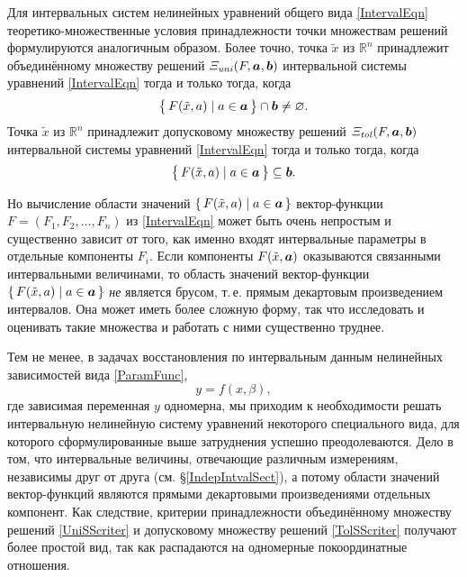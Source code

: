 \documentclass[a5paper,openany]{book}
\newcommand{\mbf}[1]{\protect\text{\boldmath$#1$}}
\newcommand{\mbb}{\mathbb}
\newcommand{\USS}{\varXi_\mathit{\hspace{-0.5pt}uni}}
\newcommand{\TSS}{\varXi_\mathit{\hspace{-0.5pt}tol}}
\begin{document}
Для интервальных систем нелинейных уравнений общего вида \eqref{IntervalEqn} 
теоретико-множественные условия принадлежности точки множествам решений формулируются 
аналогичным образом. Более точно, точка $\tilde{x}$ из $\mbb{R}^n$ принадлежит 
объединённому множеству решений $\USS(F,\mbf{a}, \mbf{b})$ интервальной системы 
уравнений \eqref{IntervalEqn} тогда и только тогда, когда 
\begin{equation} 
\label{UniSScriter} 
\bigl\{\,F(\tilde{x},a) \mid a\in\mbf{a}\,\bigr\}\cap\mbf{b}\neq\varnothing. 
\end{equation}
Точка $\tilde{x}$ из $\mbb{R}^n$ принадлежит допусковому множеству решений 
$\TSS(F,\mbf{a}, \mbf{b})$ интервальной системы уравнений \eqref{IntervalEqn} 
тогда и только тогда, когда 
\begin{equation}
\label{TolSScriter} 
\bigl\{\,F(\tilde{x},a) \mid a\in\mbf{a}\,\bigr\}\subseteq\mbf{b}. 
\end{equation} 
  
Но вычисление области значений $\{\,F(\tilde{x},a) \mid a\in\mbf{a}\,\}$ 
вектор-функции $F = (F_{1}, F_{2}, \ldots, F_{n})$ из \eqref{IntervalEqn} 
может быть очень непростым и существенно зависит от того, как именно входят 
интервальные параметры в отдельные компоненты $F_i$. Если компоненты $F(\tilde{x}, 
\mbf{a})$ оказываются связанными интервальными величинами, то область значений 
вектор-функции $\{\,F(\tilde{x},a) \mid a\in\mbf{a}\,\}$ \emph{не} является брусом, 
т.\,е. прямым декартовым произведением интервалов. Она может иметь более сложную 
форму, так что исследовать и оценивать такие множества и работать с ними существенно 
труднее. 
  
Тем не менее, в задачах восстановления по интервальным данным нелинейных 
зависимостей вида \eqref{ParamFunc}, 
\begin{equation*}
y = f(x,\beta), 
\end{equation*}
где зависимая переменная $y$ одномерна, мы приходим к необходимости решать 
интервальную нелинейную систему уравнений некоторого специального вида, 
для которого сформулированные выше затруднения успешно преодолеваются. Дело в том, 
что интервальные величины, отвечающие различным измерениям, независимы друг от друга 
(см. \S\ref{IndepIntvalSect}), а потому области значений вектор-функций являются 
прямыми декартовыми произведениями отдельных компонент.  
Как следствие, критерии принадлежности объединённому множеству решений 
\eqref{UniSScriter} и допусковому множеству решений \eqref{TolSScriter} получают 
более простой вид, так как распадаются на одномерные покоординатные отношения. 
  
\end{document}
